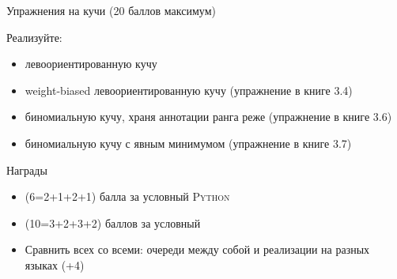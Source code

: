 \begin{frame}{Упражнения на кучи (20 баллов максимум)}

Реализуйте:
\begin{itemize}
\item левоориентированную кучу
\item weight-biased левоориентированную кучу (упражнение в книге 3.4)
\item  биномиальную кучу, храня аннотации ранга реже (упражнение в книге 3.6)
\item биномиальную кучу с явным минимумом (упражнение в книге 3.7)
\end{itemize}

Награды
\begin{itemize}
\item (6=2+1+2+1) балла за условный \textsc{Python}
\item (10=3+2+3+2) баллов за условный \OCaml{}
\item Сравнить всех со всеми: очереди между собой и реализации на разных языках (+4)
\end{itemize}


\end{frame}


